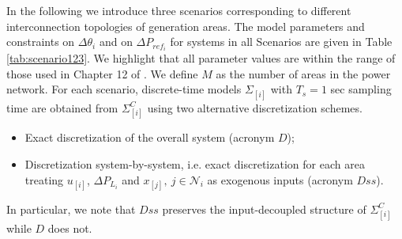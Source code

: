 \documentclass[a4paper]{article}
\newcommand{\NN}{{\mathcal N}}
\newcommand{\subss}[2]{#1_{[#2]}}
\begin{document}
          In the following we introduce three scenarios corresponding to different interconnection topologies of generation areas. The model parameters and constraints on $\Delta\theta_i$ and on $\Delta P_{ref_i}$ for systems in all Scenarios are given in Table \ref{tab:scenario123}. We highlight that all parameter values are within the range of those used in Chapter 12 of \cite{Saadat2002}. We define $M$ as the number of areas in the power network. For each scenario, discrete-time models $\subss\Sigma i$ with $T_s = 1$ sec sampling time are obtained from $\subss\Sigma i^C$ using two alternative discretization schemes.
          \begin{itemize}
          \item Exact discretization of the overall system (acronym $D$);
          \item Discretization system-by-system, i.e. exact discretization for each area treating $\subss u i$, $\Delta P_{L_i}$ and $\subss x j,~j\in\NN_i$ as exogenous inputs (acronym $Dss$).
          \end{itemize}
          In particular, we note that $Dss$ preserves the input-decoupled structure of $\subss\Sigma i^C$ while $D$ does not.
\end{document}
